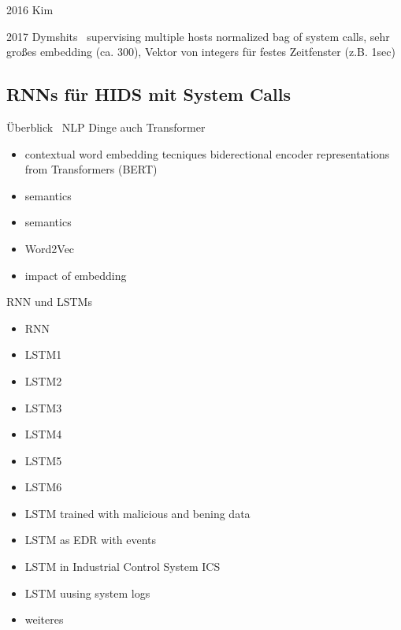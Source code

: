 2016 Kim~\cite{LSTMsys} 

2017 Dymshits~\cite{LSTMDYMSHITS2017} supervising multiple hosts
normalized bag of system calls, sehr großes embedding (ca. 300), Vektor von integers für festes Zeitfenster (z.B. 1sec)



\subsection{RNNs für HIDS mit System Calls}
    Überblick~\cite{NLPHIDSSWORNA2022}
    NLP Dinge auch Transformer
    \begin{itemize}
        \item contextual word embedding tecniques biderectional encoder representations from Transformers (BERT)~\cite{NLPBERT2018}
        \item semantics~\cite{SEMANTICSLAKSHMANAN2015}
        \item semantics~\cite{SEMANTICSCREECH2014}
        \item Word2Vec~\cite{W2VWUNDERLICH2019}
        \item impact of embedding~\cite{IMPACTOFEMBEDDINGWUNDERLICH2020}
    \end{itemize}
    RNN und LSTMs
    \begin{itemize}
        \item RNN~\cite{RNN/CNN}
        \item LSTM1~\cite{LSTMsys}
        \item LSTM2~\cite{LSTMSURATKAR2019} 
        \item LSTM3~\cite{NIU2020} 
        \item LSTM4~\cite{BIDIRECTIONALLSTMCHAWLA2019} 
        \item LSTM5~\cite{VARIATIONALLSTMBOUZAR2019} 
        \item LSTM6~\cite{RNNVEDBOUZAR2020} 
        \item LSTM trained with malicious and bening data~\cite{LSTMKIM2016} %
        \item LSTM as EDR with events~\cite{EVENTLSTMVASQUEZ2020}
        \item LSTM in Industrial Control System ICS~\cite{ICSLSTMFENG2017} %
        \item LSTM uusing system logs~\cite{LOGLSTMMIN2017} %
        
        \item weiteres
    \end{itemize}
